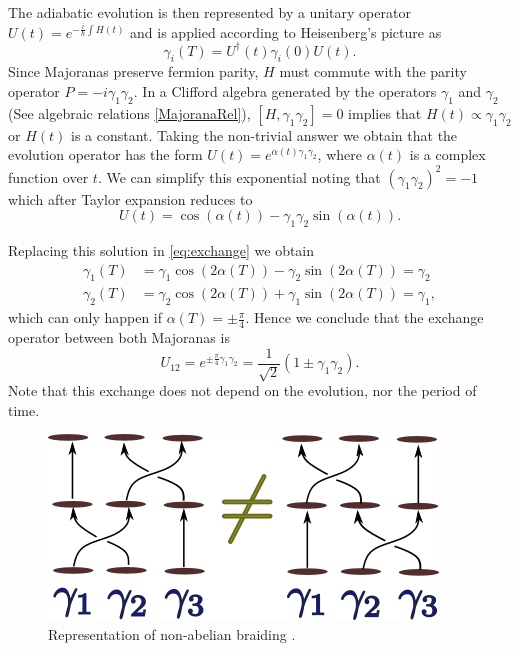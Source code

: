 The adiabatic evolution is then represented by a unitary operator  $ U(t) = e^{-\frac{i}{\hbar}\int H(t)} $ and is applied according to Heisenberg's picture as 
$$\gamma_i(T) = U^\dagger(t)\gamma_i(0)U(t).$$
 \noindent Since Majoranas preserve fermion parity,  $H$ must commute with the parity operator  $P = -i\gamma_{1}\gamma_{2} $. In a Clifford algebra generated by the operators $\gamma_1$ and $\gamma_2$ (See algebraic relations \eqref{MajoranaRel}), $[H,\gamma_{1}\gamma_{2}]=0$ implies that $H(t) \propto \gamma_{1}\gamma_{2}$ or $H(t)$ is a constant. Taking the non-trivial answer we obtain that the  evolution operator has the form $  U(t) = e^{\alpha(t) \gamma_1\gamma_2}$, where $\alpha(t)$ is a complex function over $t$. We can simplify this exponential noting that $\left( \gamma_1\gamma_2 \right)^2 =-1$ which after Taylor expansion reduces to
 \begin{equation}
  U(t) = \cos(\alpha(t))-\gamma_1\gamma_2\sin(\alpha(t)).
 \end{equation}

Replacing this solution in \eqref{eq:exchange} we obtain 
\begin{equation}
\begin{aligned}
\gamma_1(T) &= \gamma_1 \cos(2\alpha(T))- \gamma_2 \sin(2\alpha(T)) = \gamma_2\\
\gamma_2(T) &= \gamma_2 \cos(2\alpha(T))+ \gamma_1 \sin(2\alpha(T)) = \gamma_1,
\end{aligned}
\label{eq:nonab}
\end{equation}
which can only happen if $\alpha(T) = \pm\frac{\pi}{4}$. Hence we conclude that the exchange operator between both Majoranas is 
\begin{equation}
U_{12} = e^{\pm\frac{\pi}{4} \gamma_1\gamma_2}=\frac{1}{\sqrt{2}}\left( 1 \pm \gamma_1 \gamma_2 \right).
\end{equation}
Note that this exchange does not depend on the  evolution, nor  the period of time. 

\begin{figure}
  \centering
  \includegraphics[scale=1]{IMAGES/Majorana/nonAb.png}
  \caption{\label{fig:Non-ab} Representation of non-abelian braiding .}
\end{figure}

